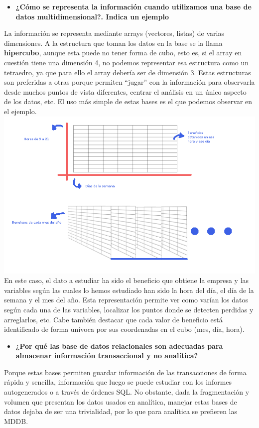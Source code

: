 \documentclass[paper=a4, fontsize=11pt]{scrartcl} %
\begin{document}
\begin{itemize}
\item \textbf{¿Cómo se representa la información cuando utilizamos una base de datos multidimensional?. Indica un ejemplo}
\end{itemize}
La información se representa mediante arrays (vectores, listas) de varias dimensiones. A la estructura que toman los datos en la base se la llama \textbf{hipercubo}, aunque esta puede no tener forma de cubo, esto es, si el array en cuestión tiene una dimensión 4, no podemos representar esa estructura como un tetraedro, ya que para ello el array debería ser de dimensión 3. Estas estructuras son preferidas a otras porque permiten ``jugar'' con la información para observarla desde muchos puntos de vista diferentes, centrar el análisis en un único aspecto de los datos, etc. El uso más simple de estas bases es el que podemos observar en el ejemplo.
\includegraphics[scale=0.75]{ejemplo}
\newline
En este caso, el dato a estudiar ha sido el beneficio que obtiene la empresa y las variables según las cuales lo hemos estudiado han sido la hora del día, el día de la semana y el mes del año. Esta representación permite ver como varían los datos según cada una de las variables, localizar los puntos donde se detecten perdidas y arreglarlos, etc. Cabe también destacar que cada valor de beneficio está identificado de forma unívoca por sus coordenadas en el cubo (mes, día, hora).

\begin{itemize}
\item \textbf{¿Por qué las base de datos relacionales son adecuadas para almacenar información transaccional y no analítica?}
\end{itemize}
Porque estas bases permiten guardar información de las transacciones de forma rápida y sencilla, información que luego se puede estudiar con los informes autogenerados o a través de órdenes SQL. No obstante, dada la fragmentación y volumen que presentan los datos usados en analítica, manejar estas bases de datos dejaba de ser una trivialidad, por lo que para analítica se prefieren las MDDB.
\end{document}
